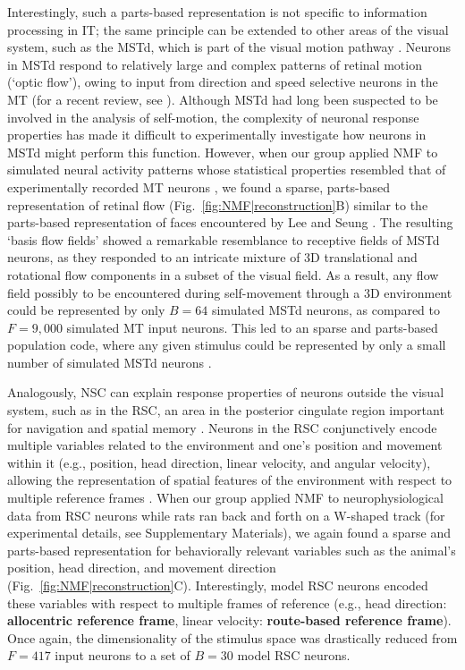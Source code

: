 Interestingly, such a parts-based representation is not specific to
information processing in \ac{IT};
the same principle can be extended to other areas of the visual system,
such as the \ac{MSTd},
which is part of the visual motion pathway \cite{Beyeler2016}.
Neurons in \ac{MSTd} respond to relatively large and complex patterns
of retinal motion (`optic flow'),
owing to input from direction and speed selective neurons in the \ac{MT}
(for a recent review, see \cite{Orban2007}).
Although \ac{MSTd} had long been suspected to be involved in the
analysis of self-motion,
the complexity of neuronal response properties has made it difficult
to experimentally investigate how neurons in \ac{MSTd}
might perform this function.
However, when our group
applied \ac{NMF} to 
simulated neural activity patterns whose statistical properties
resembled that of experimentally recorded \ac{MT} neurons
\cite{Beyeler2016},
we found a sparse, parts-based representation of retinal flow
(Fig.~\ref{fig:NMF|reconstruction}B)
similar to the parts-based representation of faces
encountered by Lee and Seung \cite{LeeSeung1999}.
The resulting `basis flow fields' showed a remarkable resemblance to receptive fields
of \ac{MSTd} neurons, as they responded to
an intricate mixture of
3D translational and rotational flow components
in a subset of the visual field.
As a result, any flow field possibly to be encountered 
during self-movement through a 3D environment
could be represented by only $B = 64$ simulated \ac{MSTd} neurons,
as compared to $F = 9,000$ simulated \ac{MT} input neurons.
This led to an sparse and parts-based population code,
where any given stimulus could be represented
by only a small number of simulated \ac{MSTd} neurons
\cite{Beyeler2016}.

Analogously, \ac{NSC} can explain response properties
of neurons outside the visual system, 
such as in the \ac{RSC}, an area in the posterior cingulate region
important for navigation and spatial memory \cite{Miller2014,Nelson2015,VannAggleton2009}.
Neurons in the \ac{RSC} conjunctively encode multiple variables related to the environment and one's position and movement within it
(e.g., position, head direction, linear velocity, and angular velocity),
allowing the representation of spatial features of the environment 
with respect to multiple reference frames \cite{AlexanderNitz2015}.
When our group applied \ac{NMF} to neurophysiological data from
\ac{RSC} neurons while rats ran back and forth on a W-shaped track
(for experimental details, see Supplementary Materials),
we again found a sparse and parts-based representation for behaviorally
relevant variables such as the animal's position, head direction, 
and movement direction (Fig.~\ref{fig:NMF|reconstruction}C).
Interestingly, model \ac{RSC} neurons encoded these variables with respect
to multiple frames of reference
(e.g., head direction: \textbf{allocentric reference frame},
linear velocity: \textbf{route-based reference frame}).
Once again, the dimensionality of the stimulus space was drastically reduced
from $F = 417$ input neurons to a set of $B = 30$ model \ac{RSC} neurons.


